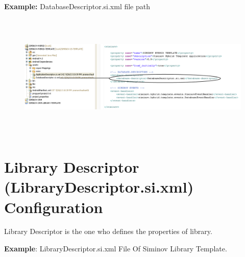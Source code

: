 \newpage
	\par
		\textbf{Example:} DatabaseDescriptor.si.xml file path
		\begin{figure}[htbp]
			\centering
				\includegraphics[height=6cm]{Resources/siminov_hybrid_template_application_database_descriptor_path_example.png}
		\end{figure}




\newpage
\section{Library Descriptor (LibraryDescriptor.si.xml) Configuration}
	Library Descriptor is the one who defines the properties of library.



\textbf{Example}: LibraryDescriptor.si.xml File Of Siminov Library Template.



